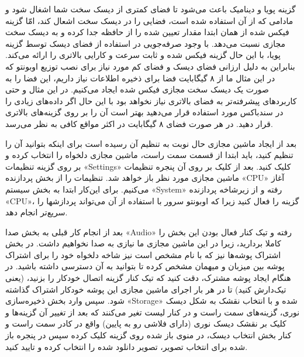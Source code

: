 گزینه پویا و دینامیک باعث می‌شود تا فضای کمتری از دیسک سخت شما اشغال شود و مادامی که از آن استفاده شده است، فضایی را در دیسک سخت اشعال کند، امّا گزینه فیکس شده از همان ابتدا مقدار تعیین شده را از حافظه جدا کرده و به دیسک سخت مجازی نسبت می‌دهد. با وجود صرفه‌جویی در استفاده از فضای دیسک توسط گزینه پویا، با این حال گزینه فیکس شده و ثابت سرعت و کارایی بالاتری را ارائه می‌کند. بنابراین به دلیل ارزانی فضای دیسک و فضای کم مورد نیاز برای نصب توزیع اوبونتو که در این مثال ما از ۸ گیگابایت فضا برای ذخیره اطلاعات نیاز داریم،  این فضا را به صورت یک دیسک سخت مجازی فیکس شده ایجاد می‌کنیم. در این مثال و حتی کاربردهای پیشرفته‌تر به فضای بالاتری نیاز نخواهد بود با این حال اگر داده‌های زیادی را در سندباکس مورد استفاده قرار می‌دهید بهتر است آن را بر روی گزینه‌های بالاتری قرار دهید. در هر صورت فضای ۸ گیگابایت در اکثر مواقع کافی به نظر می‌رسد.

بعد از ایجاد ماشین مجازی حال نوبت به تنظیم آن رسیده است برای اینکه بتوانید آن را تنظیم کنید، باید ابتدا از قسمت سمت راست، ماشین مجازی دلخواه را انتخاب کرده و بر روی گزینه تنظیمات «Settings» کلیک کنید. بعد از کلیک بر روی آن پنجره تنظیمات ماشین مجازی مورد نظر باز خواهد شد. تنظیمات را از بخش پردازنده «CPU» آغاز می‌کنیم. برای این‌کار ابتدا به بخش سیستم «System» رفته و از زیرشاخه پردازنده «CPU»، گزینه 
 را فعال کنید زیرا که اوبونتو سرور با استفاده از آن می‌تواند پردازشها را سریع‌تر انجام دهد.

بعد از انجام کار قبلی به بخش صدا «Audio» رفته و تیک کنار فعال بودن این بخش را کاملا بردارید، زیرا در این ماشین مجازی ما نیازی به صدا نخواهیم داشت.  در بخش اشتراک پوشه‌ها نیز که با نام 
مشخص است نیز شاخه دلخواه خود را برای اشتراک پوشه  بین میزبان و میهمان مشخص کرده تا بتوانید به آن دسترسی داشته باشید. در هنگام ایجاد پوشه مشترک، دقت کنید که تیک کنار گزینه اتصال خودکار 
را بزنید، (یعنی تیک‌دارش کنید) تا در هر بار اجرای ماشین مجازی این پوشه خودکار اشتراک گذاشته شود. سپس وارد بخش ذخیره‌سازی «Storage» شده و با انتخاب نقشک به شکل دیسک نوری، گزینه‌های سمت راست و در کنار لیست تغیر می‌کنند که بعد از تغییر آن گزینه‌ها و کلیک بر نقشک دیسک نوری (دارای فلاشی رو به پایین) واقع در کادر سمت راست و کنار بخش انتخاب دیسک،  در منوی باز شده روی گزینه 
 کلیک کرده سپس در پنجره باز شده برای انتخاب تصویر، تصویر دانلود شده را انتخاب کرده و تایید کنید.

